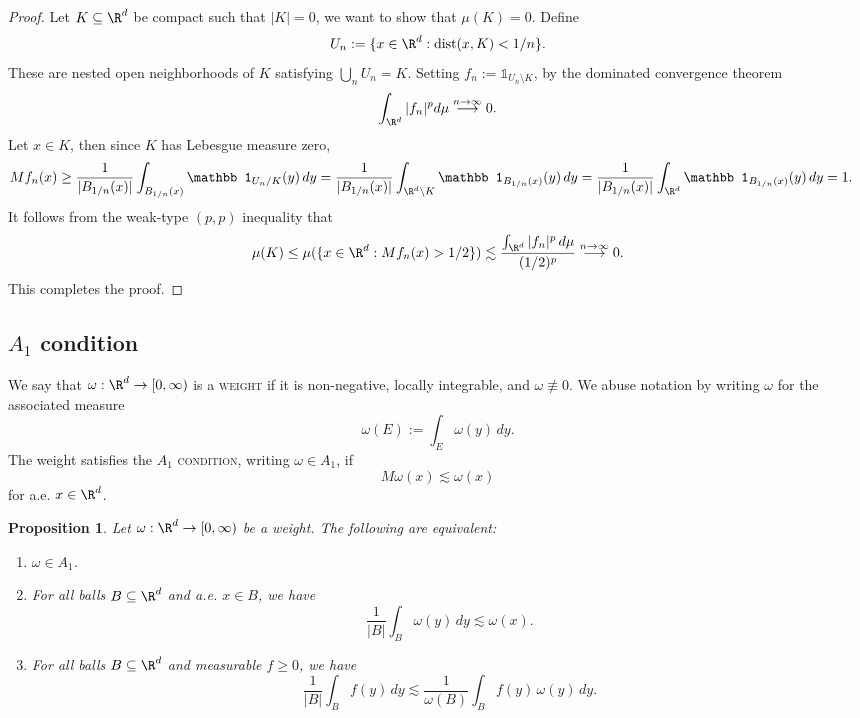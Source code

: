 \documentclass[reqno]{amsart}
\newtheorem{proposition}[theorem]{Proposition}
\theoremstyle{definition}
\theoremstyle{remark}
\renewcommand{\emph}{\textsc}
\begin{document}
\begin{proof}
	Let $K \subseteq \R^d$ be compact such that $|K| = 0$, we want to show that $\mu(K) = 0$. Define
		\[ U_n := \{x \in \R^d : \operatorname{dist} (x, K) < 1/n \}.\]
	These are nested open neighborhoods of $K$ satisfying $\bigcup_n U_n = K$. Setting $f_n := \mathbb 1_{U_n \setminus K}$, by the dominated convergence theorem
		\[ \int_{\R^d} |f_n|^p d\mu \overset{n \to \infty}{\longrightarrow} 0 .\]
	Let $x \in K$, then since $K$ has Lebesgue measure zero, 
		\begin{align*}
			Mf_n (x)
				&\geq \frac{1}{|B_{1/n}(x)|} \int_{B_{1/n} (x)} \mathbb 1_{U_n/K} (y) \, dy = \frac{1}{|B_{1/n}(x)|} \int_{\R^d \setminus K} \mathbb 1_{B_{1/n} (x)} (y) \, dy = \frac{1}{|B_{1/n}(x)|} \int_{\R^d} \mathbb 1_{B_{1/n} (x)} (y) \, dy = 1.
		\end{align*}	
	It follows from the weak-type $(p,p)$ inequality that
		\[ \mu(K) \leq \mu(\{ x \in \R^d : Mf_n (x) > 1/2 \}) \lesssim \frac{\int_{\R^d} |f_n|^p \, d\mu}{(1/2)^p} \overset{n \to \infty}{\longrightarrow} 0. \]
	This completes the proof. 		
\end{proof}


\subsection{$A_1$ condition}

We say that $\omega : \R^d \to [0, \infty)$ is a \emph{weight} if it is non-negative, locally integrable, and $\omega \not\equiv 0$. We abuse notation by writing $\omega$ for the associated measure
	\[ \omega(E) := \int_E \omega(y) \, dy. \]
The weight satisfies the \emph{$A_1$ condition}, writing $\omega \in A_1$, if  
	\[ M\omega (x) \lesssim \omega (x)\]
for a.e. $x \in \R^d$.  

\begin{proposition}
	Let $\omega: \R^d \to [0, \infty)$ be a weight. The following are equivalent:
	\begin{enumerate}
		\item $\omega \in A_1$. 
		\item For all balls $B \subseteq \R^d$ and a.e. $x \in B$, we have
						\[ \frac{1}{|B|} \int_B \omega(y) \, dy \lesssim \omega (x). \]
		\item For all balls $B \subseteq \R^d$ and measurable $f \geq 0$, we have
						\[ \frac{1}{|B|} \int_B f(y) \, dy \lesssim \frac{1}{\omega(B)} \int_B f(y) \, \omega(y) \, dy. \]
	\end{enumerate}\label{prop:a1}
\end{proposition}
\end{document}
